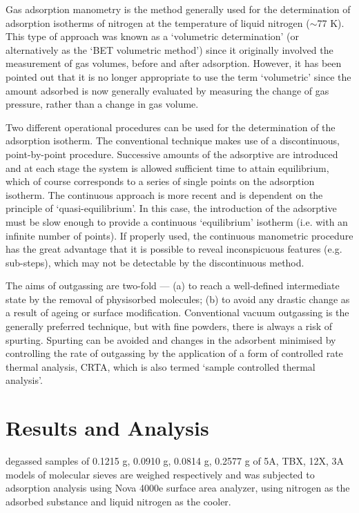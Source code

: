 \documentclass[%
 reprint,
 amsmath,amssymb,
 aps,
10.5pt,
]{revtex4-1}
\begin{document}
Gas adsorption manometry is the method generally
used for the determination of adsorption
isotherms of nitrogen at the temperature of liquid
nitrogen ($\sim$77 K). This type of approach was
known as a `volumetric determination' (or alternatively
as the `BET volumetric method') since it
originally involved the measurement of gas volumes,
before and after adsorption. However, it
has been pointed out that it is no longer
appropriate to use the term `volumetric' since the
amount adsorbed is now generally evaluated by
measuring the change of gas pressure, rather than
a change in gas volume.

Two different operational procedures can be
used for the determination of the adsorption
isotherm. The conventional technique makes use
of a discontinuous, point-by-point procedure.
Successive amounts of the adsorptive are introduced
and at each stage the system is allowed
sufficient time to attain equilibrium, which of
course corresponds to a series of single points
on the adsorption isotherm. The continuous approach
is more recent and is dependent on the
principle of `quasi-equilibrium'. In this
case, the introduction of the adsorptive must be
slow enough to provide a continuous `equilibrium'
isotherm (i.e. with an infinite number of
points). If properly used, the continuous manometric
procedure has the great advantage that it
is possible to reveal inconspicuous features (e.g.
sub-steps), which may not be detectable by the
discontinuous method.

The aims of outgassing are two-fold —
(a) to reach a well-defined intermediate state by
the removal of physisorbed molecules; (b) to
avoid any drastic change as a result of ageing
or surface modification. Conventional vacuum
outgassing is the generally preferred technique,
but with fine powders, there is always a risk of
spurting. Spurting can be avoided and changes
in the adsorbent minimised by controlling the
rate of outgassing by the application of a form
of controlled rate thermal analysis, CRTA,
which is also termed `sample controlled thermal
analysis'.

\section{Results and Analysis}
degassed samples of 0.1215 g, 0.0910 g, 0.0814 g, 0.2577 g of 5A, TBX, 12X, 3A models of molecular sieves are weighed respectively and was subjected to adsorption analysis using Nova 4000e surface area analyzer, using nitrogen as the adsorbed substance and liquid nitrogen as the cooler. 
\end{document}

